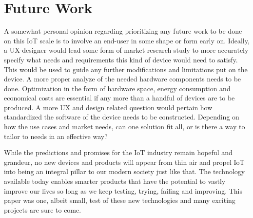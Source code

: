 \iffalse
\begin{itemize}
	\item Critique
	\item Discussion
	\item Don't make the reader do all the work
\end{itemize}
\fi


\section{Future Work}
A somewhat personal opinion regarding prioritizing any future work to be done on this IoT scale is to involve an end-user in some shape or form early on. Ideally, a UX-designer would lead some form of market research study to more accurately specify what needs and requirements this kind of device would need to satisfy. This would be used to guide any further modifications and limitations put on the device.
A more proper analyze of the needed hardware components needs to be done. Optimization in the form of hardware space, energy consumption and economical costs are essential if any more than a handful of devices are to be produced.
A more UX and design related question would pertain how standardized the software of the device needs to be constructed. Depending on how the use cases and market needs, can one solution fit all, or is there a way to tailor to needs in an effective way?


While the predictions and promises for the IoT industry remain hopeful and grandeur, no new devices and products will appear from thin air and propel IoT into being an integral pillar to our modern society just like that. The technology available today enables smarter products that have the potential to vastly improve our lives so long as we keep testing, trying, failing and improving. This paper was one, albeit small, test of these new technologies and many exciting projects are sure to come.
